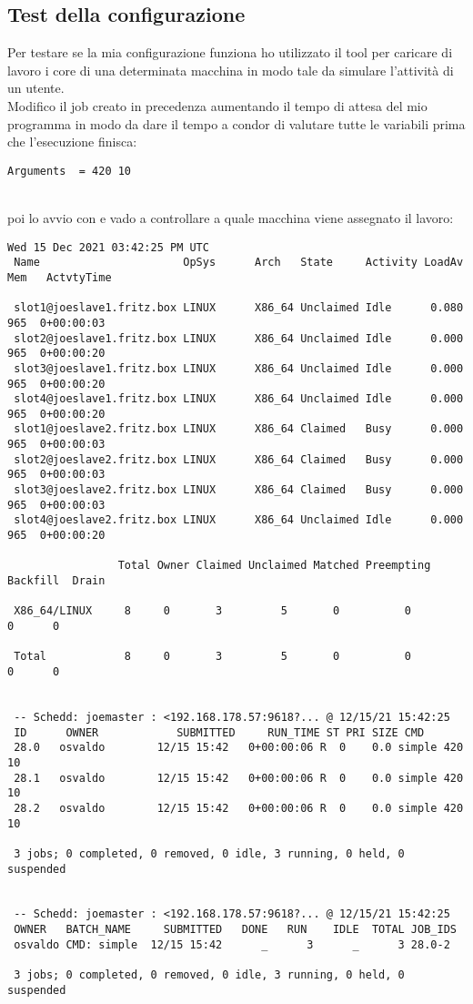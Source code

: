 \subsection{Test della configurazione}

Per testare se la mia configurazione funziona ho utilizzato il tool  per caricare di lavoro i core di una determinata macchina in modo tale da simulare l'attivit\`{a} di un utente.\\
Modifico il job creato in precedenza aumentando il tempo di attesa del mio programma in modo da dare il tempo a condor di valutare tutte le variabili prima che l'esecuzione finisca: 

\begin{lstlisting}[style=cmd]
  Arguments  = 420 10
\end{lstlisting}
\ \\
poi lo avvio con  e vado a controllare a quale macchina viene assegnato il lavoro:
\pagebreak
\begin{lstlisting}[style=output_tiny]
  Wed 15 Dec 2021 03:42:25 PM UTC
 Name                      OpSys      Arch   State     Activity LoadAv Mem   ActvtyTime
 
 slot1@joeslave1.fritz.box LINUX      X86_64 Unclaimed Idle      0.080  965  0+00:00:03
 slot2@joeslave1.fritz.box LINUX      X86_64 Unclaimed Idle      0.000  965  0+00:00:20
 slot3@joeslave1.fritz.box LINUX      X86_64 Unclaimed Idle      0.000  965  0+00:00:20
 slot4@joeslave1.fritz.box LINUX      X86_64 Unclaimed Idle      0.000  965  0+00:00:20
 slot1@joeslave2.fritz.box LINUX      X86_64 Claimed   Busy      0.000  965  0+00:00:03
 slot2@joeslave2.fritz.box LINUX      X86_64 Claimed   Busy      0.000  965  0+00:00:03
 slot3@joeslave2.fritz.box LINUX      X86_64 Claimed   Busy      0.000  965  0+00:00:03
 slot4@joeslave2.fritz.box LINUX      X86_64 Unclaimed Idle      0.000  965  0+00:00:20
 
                 Total Owner Claimed Unclaimed Matched Preempting Backfill  Drain
 
 X86_64/LINUX     8     0       3         5       0          0        0      0
 
 Total            8     0       3         5       0          0        0      0
 
 
 -- Schedd: joemaster : <192.168.178.57:9618?... @ 12/15/21 15:42:25
 ID      OWNER            SUBMITTED     RUN_TIME ST PRI SIZE CMD
 28.0   osvaldo        12/15 15:42   0+00:00:06 R  0    0.0 simple 420 10
 28.1   osvaldo        12/15 15:42   0+00:00:06 R  0    0.0 simple 420 10
 28.2   osvaldo        12/15 15:42   0+00:00:06 R  0    0.0 simple 420 10
 
 3 jobs; 0 completed, 0 removed, 0 idle, 3 running, 0 held, 0 suspended
 
 
 -- Schedd: joemaster : <192.168.178.57:9618?... @ 12/15/21 15:42:25
 OWNER   BATCH_NAME     SUBMITTED   DONE   RUN    IDLE  TOTAL JOB_IDS
 osvaldo CMD: simple  12/15 15:42      _      3      _      3 28.0-2
 
 3 jobs; 0 completed, 0 removed, 0 idle, 3 running, 0 held, 0 suspended
 
\end{lstlisting}
